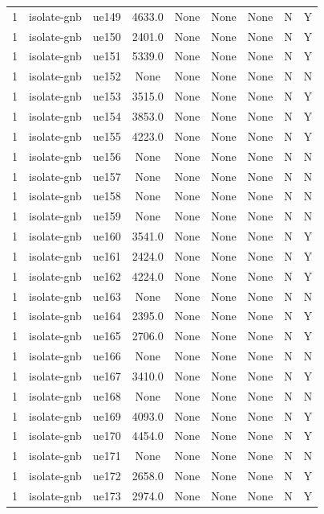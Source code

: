 \begin{table}[ht]
\begin{tabular}{|c|c|c|c|c|c|c|c|c|}
1 & isolate-gnb & ue149 & 4633.0 & None & None & None & N & Y \\
1 & isolate-gnb & ue150 & 2401.0 & None & None & None & N & Y \\
1 & isolate-gnb & ue151 & 5339.0 & None & None & None & N & Y \\
1 & isolate-gnb & ue152 & None & None & None & None & N & N \\
1 & isolate-gnb & ue153 & 3515.0 & None & None & None & N & Y \\
1 & isolate-gnb & ue154 & 3853.0 & None & None & None & N & Y \\
1 & isolate-gnb & ue155 & 4223.0 & None & None & None & N & Y \\
1 & isolate-gnb & ue156 & None & None & None & None & N & N \\
1 & isolate-gnb & ue157 & None & None & None & None & N & N \\
1 & isolate-gnb & ue158 & None & None & None & None & N & N \\
1 & isolate-gnb & ue159 & None & None & None & None & N & N \\
1 & isolate-gnb & ue160 & 3541.0 & None & None & None & N & Y \\
1 & isolate-gnb & ue161 & 2424.0 & None & None & None & N & Y \\
1 & isolate-gnb & ue162 & 4224.0 & None & None & None & N & Y \\
1 & isolate-gnb & ue163 & None & None & None & None & N & N \\
1 & isolate-gnb & ue164 & 2395.0 & None & None & None & N & Y \\
1 & isolate-gnb & ue165 & 2706.0 & None & None & None & N & Y \\
1 & isolate-gnb & ue166 & None & None & None & None & N & N \\
1 & isolate-gnb & ue167 & 3410.0 & None & None & None & N & Y \\
1 & isolate-gnb & ue168 & None & None & None & None & N & N \\
1 & isolate-gnb & ue169 & 4093.0 & None & None & None & N & Y \\
1 & isolate-gnb & ue170 & 4454.0 & None & None & None & N & Y \\
1 & isolate-gnb & ue171 & None & None & None & None & N & N \\
1 & isolate-gnb & ue172 & 2658.0 & None & None & None & N & Y \\
1 & isolate-gnb & ue173 & 2974.0 & None & None & None & N & Y \\

\end{tabular}
\end{table}

